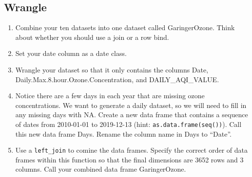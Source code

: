 \documentclass[]{article}
\newenvironment{Shaded}{\begin{snugshade}}{\end{snugshade}}
\newcommand{\CommentTok}[1]{\textcolor[rgb]{0.56,0.35,0.01}{\textit{#1}}}
\newcommand{\DataTypeTok}[1]{\textcolor[rgb]{0.13,0.29,0.53}{#1}}
\newcommand{\FloatTok}[1]{\textcolor[rgb]{0.00,0.00,0.81}{#1}}
\newcommand{\KeywordTok}[1]{\textcolor[rgb]{0.13,0.29,0.53}{\textbf{#1}}}
\newcommand{\NormalTok}[1]{#1}
\newcommand{\OperatorTok}[1]{\textcolor[rgb]{0.81,0.36,0.00}{\textbf{#1}}}
\newcommand{\StringTok}[1]{\textcolor[rgb]{0.31,0.60,0.02}{#1}}
\begin{document}
\hypertarget{wrangle}{%
\subsection{Wrangle}\label{wrangle}}

\begin{enumerate}
\def\labelenumi{\arabic{enumi}.}
\setcounter{enumi}{1}
\item
  Combine your ten datasets into one dataset called GaringerOzone. Think
  about whether you should use a join or a row bind.
\item
  Set your date column as a date class.
\item
  Wrangle your dataset so that it only contains the columns Date,
  Daily.Max.8.hour.Ozone.Concentration, and DAILY\_AQI\_VALUE.
\item
  Notice there are a few days in each year that are missing ozone
  concentrations. We want to generate a daily dataset, so we will need
  to fill in any missing days with NA. Create a new data frame that
  contains a sequence of dates from 2010-01-01 to 2019-12-13 (hint:
  \texttt{as.data.frame(seq())}). Call this new data frame Days. Rename
  the column name in Days to ``Date''.
\item
  Use a \texttt{left\_join} to comine the data frames. Specify the
  correct order of data frames within this function so that the final
  dimensions are 3652 rows and 3 columns. Call your combined data frame
  GaringerOzone.
\end{enumerate}

\begin{Shaded}
\end{Shaded}
\end{document}
